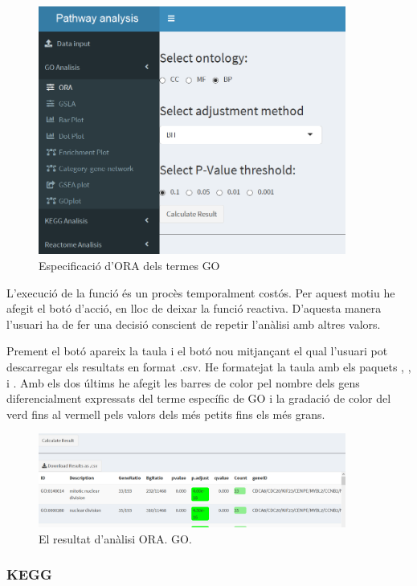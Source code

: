 \documentclass[]{article}
\begin{document}
\begin{figure}[h!]
\includegraphics[width=0.9\textwidth]{App_F5_Items_GO_ORA.png}
\caption{Especificació d'ORA dels termes GO}
\end{figure}
L'execució de la funció és un procès temporalment costós. Per aquest motiu he afegit el botó d'acció, en lloc de deixar la funció reactiva. D'aquesta manera l'usuari ha de fer una decisió conscient de repetir l'anàlisi amb altres valors.

Prement el botó apareix la taula i el botó nou mitjançant el qual l'usuari pot descarregar els resultats en format .csv. He formatejat la taula amb els paquets , ,  i . Amb els dos últims he afegit les barres de color pel nombre dels gens diferencialment expressats del terme específic de GO i la gradació de color del verd fins al vermell pels valors dels més petits fins els més grans. 

\begin{figure}[h!]
\centering
\includegraphics[width=0.9\textwidth]{App_F6_Items_GO_ORA_Table.png} 
\caption{El resultat d'anàlisi ORA. GO.}
\end{figure}


\subsubsection{KEGG}
\end{document}
